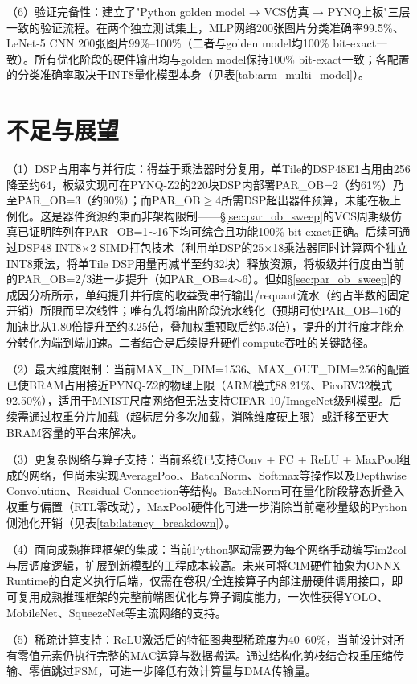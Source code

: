 \documentclass[bachelor,compact,nofont]{xjtuthesis}
\numberwithin{equation}{chapter}
\begin{document}
（6）验证完备性：建立了"Python golden model → VCS仿真 → PYNQ上板"三层一致的验证流程。在两个独立测试集上，MLP网络200张图片分类准确率99.5\%、LeNet-5 CNN 200张图片99\%--100\%（二者与golden model均100\% bit-exact一致）。所有优化阶段的硬件输出均与golden model保持100\% bit-exact一致；各配置的分类准确率取决于INT8量化模型本身（见表\ref{tab:arm_multi_model}）。

\section{不足与展望}
\label{sec:future_work}

（1）DSP占用率与并行度：得益于乘法器时分复用，单Tile的DSP48E1占用由256降至约64，板级实现可在PYNQ-Z2的220块DSP内部署PAR\_OB=2（约61\%）乃至PAR\_OB=3（约90\%）；而PAR\_OB$\geq$4所需DSP超出器件预算，未能在板上例化。这是器件资源约束而非架构限制——§\ref{sec:par_ob_sweep}的VCS周期级仿真已证明阵列在PAR\_OB=1$\sim$16下均可综合且功能100\% bit-exact正确。后续可通过DSP48 INT8×2 SIMD打包技术（利用单DSP的25×18乘法器同时计算两个独立INT8乘法，将单Tile DSP用量再减半至约32块）释放资源，将板级并行度由当前的PAR\_OB=2/3进一步提升（如PAR\_OB=4$\sim$6）。但如§\ref{sec:par_ob_sweep}的成因分析所示，单纯提升并行度的收益受串行输出/requant流水（约占半数的固定开销）所限而呈次线性；唯有先将输出阶段流水线化（预期可使PAR\_OB=16的加速比从1.80倍提升至约3.25倍，叠加权重预取后约5.3倍），提升的并行度才能充分转化为端到端加速。二者结合是后续提升硬件compute吞吐的关键路径。

（2）最大维度限制：当前MAX\_IN\_DIM=1536、MAX\_OUT\_DIM=256的配置已使BRAM占用接近PYNQ-Z2的物理上限（ARM模式88.21\%、PicoRV32模式92.50\%），适用于MNIST尺度网络但无法支持CIFAR-10/ImageNet级别模型。后续需通过权重分片加载（超标层分多次加载，消除维度硬上限）或迁移至更大BRAM容量的平台来解决。

（3）更复杂网络与算子支持：当前系统已支持Conv + FC + ReLU + MaxPool组成的网络，但尚未实现AveragePool、BatchNorm、Softmax等操作以及Depthwise Convolution、Residual Connection等结构。BatchNorm可在量化阶段静态折叠入权重与偏置（RTL零改动），MaxPool硬件化可进一步消除当前毫秒量级的Python侧池化开销（见表\ref{tab:latency_breakdown}）。

（4）面向成熟推理框架的集成：当前Python驱动需要为每个网络手动编写im2col与层调度逻辑，扩展到新模型的工程成本较高。未来可将CIM硬件抽象为ONNX Runtime的自定义执行后端，仅需在卷积/全连接算子内部注册硬件调用接口，即可复用成熟推理框架的完整前端图优化与算子调度能力，一次性获得YOLO、MobileNet、SqueezeNet等主流网络的支持。

（5）稀疏计算支持：ReLU激活后的特征图典型稀疏度为40--60\%，当前设计对所有零值元素仍执行完整的MAC运算与数据搬运。通过结构化剪枝结合权重压缩传输、零值跳过FSM，可进一步降低有效计算量与DMA传输量。
\end{document}
